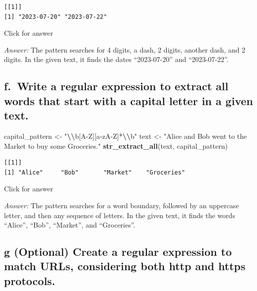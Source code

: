\documentclass[
]{book}
\newenvironment{Shaded}{\begin{snugshade}}{\end{snugshade}}
\newcommand{\FunctionTok}[1]{\textcolor[rgb]{0.13,0.29,0.53}{\textbf{#1}}}
\newcommand{\NormalTok}[1]{#1}
\newcommand{\OtherTok}[1]{\textcolor[rgb]{0.56,0.35,0.01}{#1}}
\newcommand{\SpecialCharTok}[1]{\textcolor[rgb]{0.81,0.36,0.00}{\textbf{#1}}}
\newcommand{\StringTok}[1]{\textcolor[rgb]{0.31,0.60,0.02}{#1}}
\begin{document}
\begin{verbatim}
[[1]]
[1] "2023-07-20" "2023-07-22"
\end{verbatim}

Click for answer

\emph{Answer:} The pattern searches for 4 digits, a dash, 2 digits, another dash, and 2 digits. In the given text, it finds the dates ``2023-07-20'' and ``2023-07-22''.

\hypertarget{f.-write-a-regular-expression-to-extract-all-words-that-start-with-a-capital-letter-in-a-given-text.}{%
\subsection{f.~Write a regular expression to extract all words that start with a capital letter in a given text.}\label{f.-write-a-regular-expression-to-extract-all-words-that-start-with-a-capital-letter-in-a-given-text.}}

\begin{Shaded}
\begin{Highlighting}[]
\NormalTok{capital\_pattern }\OtherTok{\textless{}{-}} \StringTok{"}\SpecialCharTok{\textbackslash{}\textbackslash{}}\StringTok{b[A{-}Z][a{-}zA{-}Z]*}\SpecialCharTok{\textbackslash{}\textbackslash{}}\StringTok{b"}
\NormalTok{text }\OtherTok{\textless{}{-}} \StringTok{"Alice and Bob went to the Market to buy some Groceries."}
\FunctionTok{str\_extract\_all}\NormalTok{(text, capital\_pattern)}
\end{Highlighting}
\end{Shaded}

\begin{verbatim}
[[1]]
[1] "Alice"     "Bob"       "Market"    "Groceries"
\end{verbatim}

Click for answer

\emph{Answer:} The pattern searches for a word boundary, followed by an uppercase letter, and then any sequence of letters. In the given text, it finds the words ``Alice'', ``Bob'', ``Market'', and ``Groceries''.

\hypertarget{g-optional-create-a-regular-expression-to-match-urls-considering-both-http-and-https-protocols.}{%
\subsection{g (Optional) Create a regular expression to match URLs, considering both http and https protocols.}\label{g-optional-create-a-regular-expression-to-match-urls-considering-both-http-and-https-protocols.}}
\end{document}

